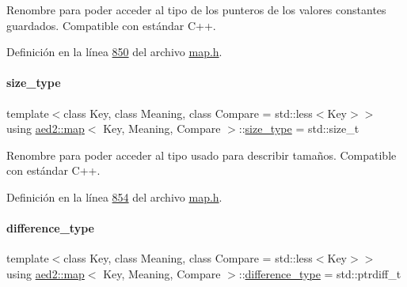 Renombre para poder acceder al tipo de los punteros de los valores constantes guardados. Compatible con estándar C++. 



Definición en la línea \hyperlink{map_8h_source_l00850}{850} del archivo \hyperlink{map_8h_source}{map.\+h}.

\mbox{\label{classaed2_1_1map_a8cf1c570f605e9c0ad6feb8ce12c9400_a8cf1c570f605e9c0ad6feb8ce12c9400}} 
\paragraph{\texorpdfstring{size\+\_\+type}{size\_type}}
{\footnotesize\ttfamily template$<$class Key, class Meaning, class Compare = std\+::less$<$\+Key$>$$>$ \\
using \hyperlink{classaed2_1_1map}{aed2\+::map}$<$ Key, Meaning, Compare $>$\+::\hyperlink{classaed2_1_1map_a8cf1c570f605e9c0ad6feb8ce12c9400_a8cf1c570f605e9c0ad6feb8ce12c9400}{size\+\_\+type} =  std\+::size\+\_\+t}



Renombre para poder acceder al tipo usado para describir tamaños. Compatible con estándar C++. 



Definición en la línea \hyperlink{map_8h_source_l00854}{854} del archivo \hyperlink{map_8h_source}{map.\+h}.

\mbox{\label{classaed2_1_1map_a2f55b88809000fcbfce1c6cfef1ba74d_a2f55b88809000fcbfce1c6cfef1ba74d}} 
\paragraph{\texorpdfstring{difference\+\_\+type}{difference\_type}}
{\footnotesize\ttfamily template$<$class Key, class Meaning, class Compare = std\+::less$<$\+Key$>$$>$ \\
using \hyperlink{classaed2_1_1map}{aed2\+::map}$<$ Key, Meaning, Compare $>$\+::\hyperlink{classaed2_1_1map_a2f55b88809000fcbfce1c6cfef1ba74d_a2f55b88809000fcbfce1c6cfef1ba74d}{difference\+\_\+type} =  std\+::ptrdiff\+\_\+t}



